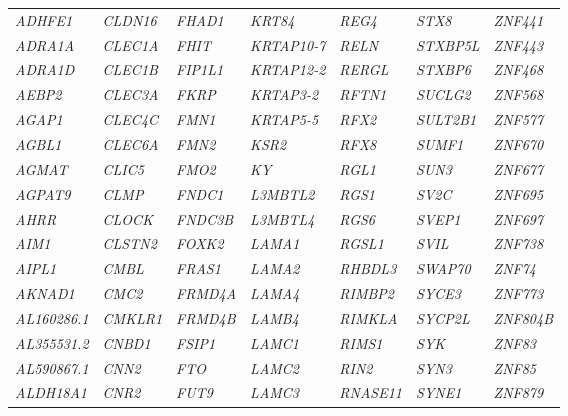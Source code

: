 \begin{refsection}
\begin{otherlanguage}{english}
\begin{scriptsize}
\begin{longtable}{lllllll}
\textit{ADHFE1} & \textit{CLDN16} & \textit{FHAD1} & \textit{KRT84} & \textit{REG4} & \textit{STX8} & \textit{ZNF441} \\
\textit{ADRA1A} & \textit{CLEC1A} & \textit{FHIT} & \textit{KRTAP10-7} & \textit{RELN} & \textit{STXBP5L} & \textit{ZNF443} \\
\textit{ADRA1D} & \textit{CLEC1B} & \textit{FIP1L1} & \textit{KRTAP12-2} & \textit{RERGL} & \textit{STXBP6} & \textit{ZNF468} \\
\textit{AEBP2} & \textit{CLEC3A} & \textit{FKRP} & \textit{KRTAP3-2} & \textit{RFTN1} & \textit{SUCLG2} & \textit{ZNF568} \\
\textit{AGAP1} & \textit{CLEC4C} & \textit{FMN1} & \textit{KRTAP5-5} & \textit{RFX2} & \textit{SULT2B1} & \textit{ZNF577} \\
\textit{AGBL1} & \textit{CLEC6A} & \textit{FMN2} & \textit{KSR2} & \textit{RFX8} & \textit{SUMF1} & \textit{ZNF670} \\
\textit{AGMAT} & \textit{CLIC5} & \textit{FMO2} & \textit{KY} & \textit{RGL1} & \textit{SUN3} & \textit{ZNF677} \\
\textit{AGPAT9} & \textit{CLMP} & \textit{FNDC1} & \textit{L3MBTL2} & \textit{RGS1} & \textit{SV2C} & \textit{ZNF695} \\
\textit{AHRR} & \textit{CLOCK} & \textit{FNDC3B} & \textit{L3MBTL4} & \textit{RGS6} & \textit{SVEP1} & \textit{ZNF697} \\
\textit{AIM1} & \textit{CLSTN2} & \textit{FOXK2} & \textit{LAMA1} & \textit{RGSL1} & \textit{SVIL} & \textit{ZNF738} \\
\textit{AIPL1} & \textit{CMBL} & \textit{FRAS1} & \textit{LAMA2} & \textit{RHBDL3} & \textit{SWAP70} & \textit{ZNF74} \\
\textit{AKNAD1} & \textit{CMC2} & \textit{FRMD4A} & \textit{LAMA4} & \textit{RIMBP2} & \textit{SYCE3} & \textit{ZNF773} \\
\textit{AL160286.1} & \textit{CMKLR1} & \textit{FRMD4B} & \textit{LAMB4} & \textit{RIMKLA} & \textit{SYCP2L} & \textit{ZNF804B} \\
\textit{AL355531.2} & \textit{CNBD1} & \textit{FSIP1} & \textit{LAMC1} & \textit{RIMS1} & \textit{SYK} & \textit{ZNF83} \\
\textit{AL590867.1} & \textit{CNN2} & \textit{FTO} & \textit{LAMC2} & \textit{RIN2} & \textit{SYN3} & \textit{ZNF85} \\
\textit{ALDH18A1} & \textit{CNR2} & \textit{FUT9} & \textit{LAMC3} & \textit{RNASE11} & \textit{SYNE1} & \textit{ZNF879} \\

\end{longtable}
\end{scriptsize}
\end{otherlanguage}
\end{refsection}
